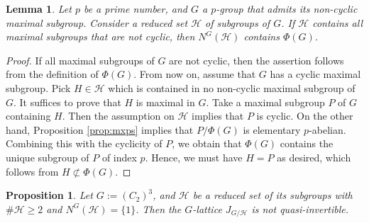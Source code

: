\documentclass[12pt]{amsart}
\theoremstyle{plain}
\newtheorem{prop}[thm]{Proposition}
\newtheorem{lem}[thm]{Lemma}
\theoremstyle{definition}
\numberwithin{thm}{section}
\numberwithin{equation}{section}
\newcommand{\cH}{\mathcal{H}}
\begin{document}
\begin{lem}\label{lem:nocy}
Let $p$ be a prime number, and $G$ a $p$-group that admits its non-cyclic maximal subgroup. Consider a reduced set $\cH$ of subgroups of $G$. If $\cH$ contains all maximal subgroups that are not cyclic, then $N^{G}(\cH)$ contains $\Phi(G)$. 
\end{lem}

\begin{proof}
If all maximal subgroups of $G$ are not cyclic, then the assertion follows from the definition of $\Phi(G)$. From now on, assume that $G$ has a cyclic maximal subgroup. Pick $H\in \cH$ which is contained in no non-cyclic maximal subgroup of $G$. It suffices to prove that $H$ is maximal in $G$. Take a maximal subgroup $P$ of $G$ containing $H$. Then the assumption on $\cH$ implies that $P$ is cyclic. On the other hand, Proposition \ref{prop:mxps} implies that $P/\Phi(G)$ is elementary $p$-abelian. Combining this with the cyclicity of $P$, we obtain that $\Phi(G)$ contains the unique subgroup of $P$ of index $p$. Hence, we must have $H=P$ as desired, which follows from $H\not\subset \Phi(G)$. 
\end{proof}

\begin{prop}\label{prop:c2nr}
Let $G:=(C_{2})^{3}$, and $\cH$ be a reduced set of its subgroups with $\#\cH \geq 2$ and $N^{G}(\cH)=\{1\}$. Then the $G$-lattice $J_{G/\cH}$ is not quasi-invertible. 
\end{prop}
\end{document}

